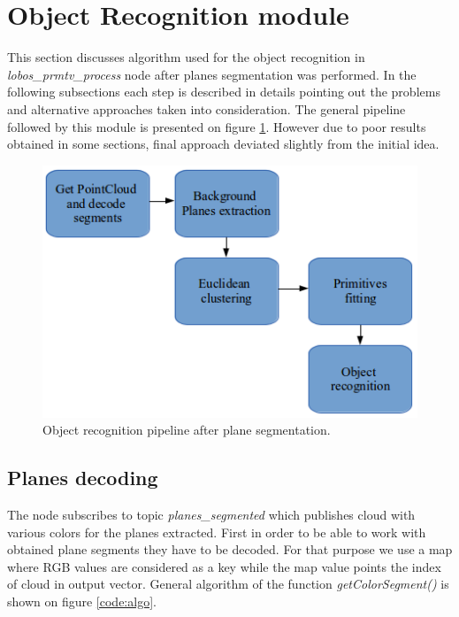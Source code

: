 \documentclass[12pt,oneside]{amsart}
\title{}
\author{}
\begin{document}
\maketitle
\section{Object Recognition module}
\label{sec:recognition}

This section discusses algorithm used for the object recognition in \emph{lobos\_prmtv\_process} node after planes segmentation was performed. In the following subsections each step is described in details pointing out the problems and alternative approaches taken into consideration. The general pipeline followed by this module is presented on figure \ref{fig:pipeline}. However due to poor results obtained in some sections, final approach deviated slightly from the initial idea.


\begin{figure}
\begin{center}
  \includegraphics[scale=0.7]{images/pipeline}
  \caption{Object recognition pipeline after plane segmentation.}
  \label{fig:pipeline}
  \end{center}
\end{figure}
\subsection{Planes decoding}
The node subscribes to topic \emph{planes\_segmented} which publishes cloud with various colors for the planes extracted. First in order to be able to work with obtained plane segments they have to be decoded. For that purpose we use a map where RGB values are considered as a key while the map value points the index of cloud in output vector. General algorithm of the function \emph{getColorSegment()} is shown on figure \ref{code:algo}.
\end{document}
